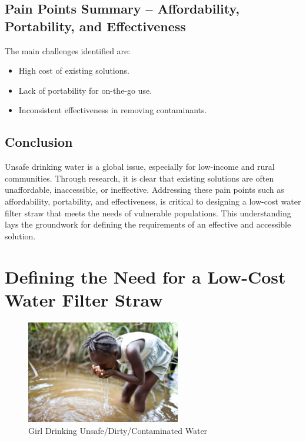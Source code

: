 \documentclass{article}
\begin{document}
\vspace{0.3cm}

\subsection{Pain Points Summary – Affordability, Portability, and Effectiveness}
The main challenges identified are:
\begin{itemize}
    \item High cost of existing solutions.
    \item Lack of portability for on-the-go use.
    \item Inconsistent effectiveness in removing contaminants.
\end{itemize}

\subsection*{Conclusion}
Unsafe drinking water is a global issue, especially for low-income and rural communities. Through research, it is clear that existing solutions are often unaffordable, inaccessible, or ineffective. Addressing these pain points such as affordability, portability, and effectiveness, is critical to designing a low-cost water filter straw that meets the needs of vulnerable populations. This understanding lays the groundwork for defining the requirements of an effective and accessible solution.

\newpage





\section{Defining the Need for a Low-Cost Water Filter Straw}

\begin{figure}[h!]
    \centering
    \includegraphics[width=0.6\textwidth]{drinkdw.jpg}
    \caption{Girl Drinking Unsafe/Dirty/Contaminated Water}
    \label{fig:dirty_water}
\end{figure}
\end{document}
